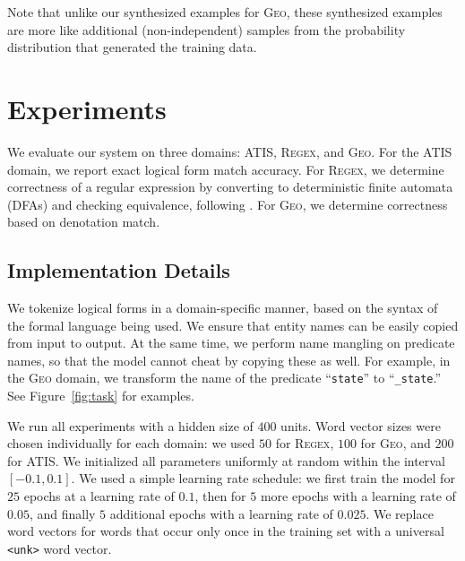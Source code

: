 \documentclass[11pt,letterpaper]{article}
\newcommand{\atis}{\textsc{ATIS}\xspace}
\newcommand{\regex}{\textsc{Regex}\xspace}
\newcommand{\geo}{\textsc{Geo}\xspace}
\newcommand\pl[1]{\textcolor{red}{[PL: #1]}}
\newcommand\rj[1]{\textcolor{blue}{[RJ: #1]}}
\renewcommand\pl[1]{}
\renewcommand\rj[1]{}
\begin{document}
Note that unlike our synthesized examples for \geo, 
these synthesized examples
are more like additional (non-independent) samples from the probability distribution
that generated the training data.

%

\section{Experiments}
We evaluate our system on three domains: \atis, \regex, and \geo.
For the \atis domain, we report exact logical form match accuracy.
For \regex, we determine correctness of a regular expression
by converting to deterministic finite automata (DFAs)
and checking equivalence, following .
For \geo, we determine correctness based on denotation match.

\subsection{Implementation Details}
We tokenize logical forms in a domain-specific manner,
based on the syntax of the formal language being used.
We ensure that entity names can be easily copied from input to output.
At the same time, we perform name mangling on predicate names,
so that the model cannot cheat by copying these as well.
For example, in the \geo domain, we transform the name
of the predicate ``\texttt{state}'' to ``\texttt{\_state}.''
See Figure~\ref{fig:task} for examples.

We run all experiments with a hidden size of $400$ units.
Word vector sizes were chosen individually for each domain:
we used $50$ for \regex, $100$ for \geo, and $200$ for \atis.
We initialized all parameters uniformly at random 
within the interval $[-0.1, 0.1]$.
We used a simple learning rate schedule:
we first train the model for $25$ epochs at a learning rate of $0.1$,
then for $5$ more epochs with a learning rate of $0.05$,
and finally $5$ additional epochs with a learning rate of $0.025$.
We replace word vectors for words that occur only once in the training set 
with a universal \texttt{<unk>} word vector.
\end{document}
